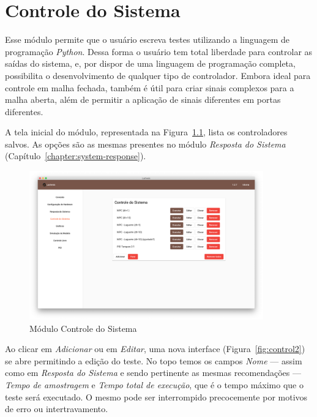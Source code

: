 
\chapter{Controle do Sistema}%
\label{chapter:system-control}

Esse módulo permite que o usuário escreva testes utilizando a linguagem de
programação \textit{Python}. Dessa forma o usuário tem total liberdade para
controlar as saídas do sistema, e, por dispor de uma linguagem de programação
completa, possibilita o desenvolvimento de qualquer tipo de controlador. Embora
ideal para controle em malha fechada, também é útil para criar sinais complexos
para a malha aberta, além de permitir a aplicação de sinais diferentes em portas
diferentes.

A tela inicial do módulo, representada na Figura~\ref{fig:control1}, lista os
controladores salvos. As opções são as mesmas presentes no módulo
\textit{Resposta do Sistema} (Capítulo~\ref{chapter:system-response}).

\begin{figure}[ht!]
    \centering
    \includegraphics[width=0.9\textwidth]{imgs/control1}
    \caption[Módulo Controle do Sistema]{Módulo Controle do Sistema}%
    \label{fig:control1}
\end{figure}

Ao clicar em \textit{Adicionar} ou em \textit{Editar}, uma nova interface
(Figura~\ref{fig:control2}) se abre permitindo a edição do teste. No topo temos
os campos \textit{Nome} --- assim como em \textit{Resposta do Sistema} e sendo
pertinente as mesmas recomendações --- \textit{Tempo de amostragem} e
\textit{Tempo total de execução}, que é o tempo máximo que o teste será
executado. O mesmo pode ser interrompido precocemente por motivos de erro ou
intertravamento.

